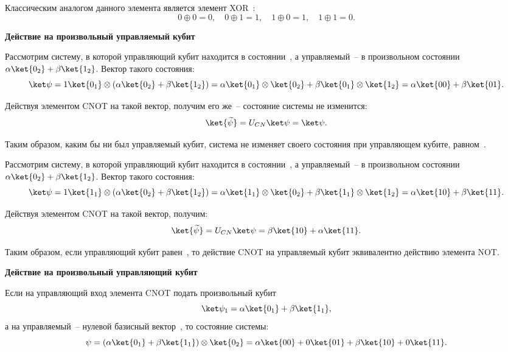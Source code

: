 \documentclass[pscyr,notitlepage]{hedwork}
\renewcommand{\~}[1]{\widetilde{#1}}
\newcommand{\lb}{\left(}
\newcommand{\rb}{\right)}
\begin{document}
  Классическим аналогом данного элемента является элемент XOR~\cite{main}:
  \[
    0 \oplus 0 = 0, \quad 0 \oplus 1 = 1, \quad
      1 \oplus 0 = 1, \quad 1 \oplus 1 = 0.
  \]
  
  \textbf{Действие на произвольный управляемый кубит}
  
  Рассмотрим систему, в которой управляющий кубит находится в
  состоянии~, а управляемый~-- в произвольном состоянии
  \( \alpha\ket{0_2} + \beta\ket{1_2} \). Вектор такого состояния:
  \[
    \ket\psi = 1\ket{0_1} \otimes \lb\alpha\ket{0_2} + \beta\ket{1_2}\rb =
      \alpha\ket{0_1} \otimes \ket{0_2} + \beta\ket{0_1} \otimes \ket{1_2} =
      \alpha\ket{00} + \beta\ket{01}.
  \]
  
  Действуя элементом CNOT на такой вектор, получим его же~-- состояние системы
  не изменится:
  \[
    \ket{\~\psi} = U_{CN}\ket\psi = \ket\psi.
  \]
  
  Таким образом, каким бы ни был управляемый кубит, система не изменяет своего
  состояния при управляющем кубите, равном~.
  
  Рассмотрим систему, в которой управляющий кубит находится в
  состоянии~, а управляемый~-- в произвольном состоянии
  \( \alpha\ket{0_2} + \beta\ket{1_2} \). Вектор такого состояния:
  \[
    \ket\psi = 1\ket{1_1} \otimes \lb\alpha\ket{0_2} + \beta\ket{1_2}\rb =
      \alpha\ket{1_1} \otimes \ket{0_2} + \beta\ket{1_1} \otimes \ket{1_2} =
      \alpha\ket{10} + \beta\ket{11}.
  \]
  
  Действуя элементом CNOT на такой вектор, получим:
  \[
    \ket{\~\psi} = U_{CN}\ket\psi = \beta\ket{10} + \alpha\ket{11}.
  \]
  
  Таким образом, если управляющий кубит равен~, то действие CNOT на
  управляемый кубит эквивалентно действию элемента NOT.~\cite{task}
  
  \textbf{Действие на произвольный управляющий кубит}
  
  Если на управляющий вход элемента CNOT подать произвольный кубит
  \[
    \ket\psi_1 = \alpha\ket{0_1} + \beta\ket{1_1},
  \]
  а на управляемый~-- нулевой базисный вектор~, то состояние системы:
  \[
    \psi = \lb\alpha\ket{0_1} + \beta\ket{1_1}\rb \otimes \ket{0_2} =
      \alpha\ket{00} + 0\ket{01} + \beta\ket{10} + 0\ket{11}.
  \]
  
\end{document}
